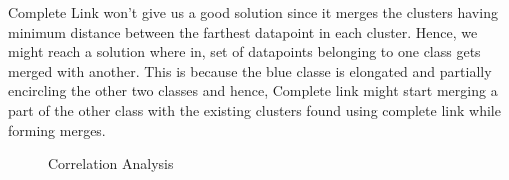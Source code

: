 \documentclass[paper=a4, fontsize=11pt]{scrartcl}
\numberwithin{equation}{section}		%
\numberwithin{figure}{section}			%
\numberwithin{table}{section}				%
\begin{document}
Complete Link won't give us a good solution since it merges the clusters having minimum distance between the farthest datapoint in each cluster. Hence, we might reach a solution where in, set of datapoints belonging to one class gets merged with another. This is because the blue classe is elongated and partially encircling the other two classes and hence, Complete link might start merging a part of the other class with the existing clusters found using complete link while forming merges. 

\begin{figure}[H]
  \centering
  \hfill
  \caption*{Correlation Analysis}
\end{figure}
\end{document}

